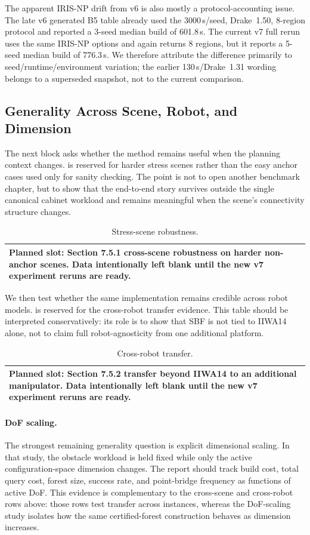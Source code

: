 \documentclass[journal]{IEEEtran}
\makeatletter
\newcommand{\plannedtable}[3]{%
\begin{table}[t]
  \centering
  \caption{#1}
  \label{#2}
  \small
  \begin{tabular}{@{}p{0.94\columnwidth}@{}}
    \toprule
    Planned slot: #3. Data intentionally left blank until the new v7
    experiment reruns are ready. \\
    \bottomrule
  \end{tabular}
\end{table}
}
\makeatother
\begin{document}
The apparent IRIS-NP drift from v6 is also mostly a protocol-accounting issue.
The late v6 generated B5 table already used the $3000$\,s/seed, Drake~1.50,
8-region protocol and reported a 3-seed median build of 601.8\,s. The current
v7 full rerun uses the same IRIS-NP options and again returns 8 regions, but it
reports a 5-seed median build of 776.3\,s. We therefore attribute the difference
primarily to seed/runtime/environment variation; the earlier 130\,s/Drake~1.31
wording belongs to a superseded snapshot, not to the current comparison.

\subsection{Generality Across Scene, Robot, and Dimension}\label{sec:exp_generality}

The next block asks whether the method remains useful when the planning context
changes.  is reserved for harder stress scenes rather than
the easy anchor cases used only for sanity checking. The point is not to open
another benchmark chapter, but to show that the end-to-end story survives
outside the single canonical cabinet workload and remains meaningful when the
scene's connectivity structure changes.

\plannedtable{Stress-scene robustness.}{tab:newscenes}{Section 7.5.1 cross-scene robustness on harder non-anchor scenes}

We then test whether the same implementation remains credible across robot
models.  is reserved for the cross-robot transfer evidence.
This table should be interpreted conservatively: its role is to show that SBF
is not tied to IIWA14 alone, not to claim full robot-agnosticity from one
additional platform.

\plannedtable{Cross-robot transfer.}{tab:panda}{Section 7.5.2 transfer beyond IIWA14 to an additional manipulator}

\paragraph{DoF scaling.}
The strongest remaining generality question is explicit dimensional scaling. In
that study, the obstacle workload is held fixed while only the active
configuration-space dimension changes. The report should track build cost, total
query cost, forest size, success rate, and point-bridge frequency as functions
of active DoF. This evidence is complementary to the cross-scene and
cross-robot rows above: those rows test transfer across instances, whereas the
DoF-scaling study isolates how the same certified-forest construction behaves
as dimension increases.
\end{document}

